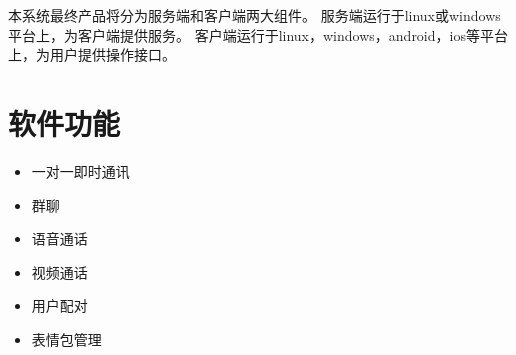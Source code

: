 



%
%    
%

本系统最终产品将分为服务端和客户端两大组件。
服务端运行于linux或windows平台上，为客户端提供服务。
客户端运行于linux，windows，android，ios等平台上，为用户提供操作接口。

\section{软件功能}
%
%
%
%
\begin{itemize}
\item 一对一即时通讯
\item 群聊
\item 语音通话
\item 视频通话
\item 用户配对
\item 表情包管理
\end{itemize}


